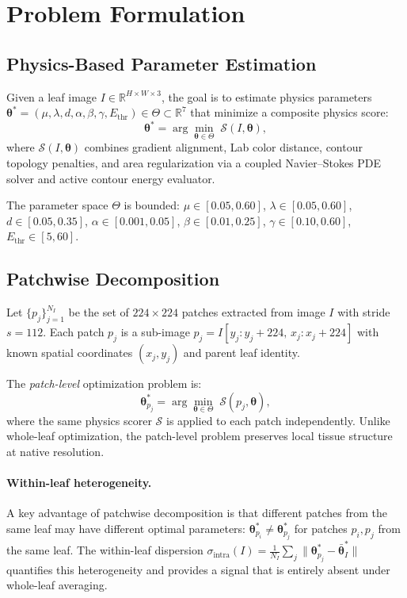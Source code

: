 \documentclass[11pt,a4paper]{article}
\newcommand{\btheta}{\boldsymbol{\theta}}
\newcommand{\cS}{\mathcal{S}}
\newcommand{\Real}{\mathbb{R}}
\begin{document}
\section{Problem Formulation}
\label{sec:problem}

\subsection{Physics-Based Parameter Estimation}

Given a leaf image $I \in \Real^{H \times W \times 3}$, the goal is to estimate
physics parameters $\btheta^* = (\mu, \lambda, d, \alpha, \beta, \gamma, E_\text{thr}) \in \Theta \subset \Real^7$
that minimize a composite physics score:
\begin{equation}
\btheta^* = \arg\min_{\btheta \in \Theta} \; \cS(I, \btheta),
\label{eq:optimization}
\end{equation}
where $\cS(I, \btheta)$ combines gradient alignment, Lab color distance,
contour topology penalties, and area regularization via a coupled
Navier--Stokes PDE solver and active contour energy evaluator.

The parameter space $\Theta$ is bounded:
$\mu \in [0.05, 0.60]$, $\lambda \in [0.05, 0.60]$, $d \in [0.05, 0.35]$,
$\alpha \in [0.001, 0.05]$, $\beta \in [0.01, 0.25]$, $\gamma \in [0.10, 0.60]$,
$E_\text{thr} \in [5, 60]$.

\subsection{Patchwise Decomposition}

Let $\{p_j\}_{j=1}^{N_I}$ be the set of $224{\times}224$ patches extracted
from image $I$ with stride $s{=}112$. Each patch $p_j$ is a sub-image
$p_j = I[y_j:y_j{+}224, \, x_j:x_j{+}224]$ with known spatial coordinates
$(x_j, y_j)$ and parent leaf identity.

The \emph{patch-level} optimization problem is:
\begin{equation}
\btheta^*_{p_j} = \arg\min_{\btheta \in \Theta} \; \cS(p_j, \btheta),
\label{eq:patch_opt}
\end{equation}
where the same physics scorer $\cS$ is applied to each patch independently.
Unlike whole-leaf optimization, the patch-level problem preserves local
tissue structure at native resolution.

\paragraph{Within-leaf heterogeneity.}
A key advantage of patchwise decomposition is that different patches from
the same leaf may have different optimal parameters:
$\btheta^*_{p_i} \neq \btheta^*_{p_j}$ for patches $p_i, p_j$ from the
same leaf. The within-leaf dispersion
$\sigma_\text{intra}(I) = \frac{1}{N_I}\sum_j \|\btheta^*_{p_j} - \bar{\btheta}^*_I\|$
quantifies this heterogeneity and provides a signal that is
entirely absent under whole-leaf averaging.
\end{document}
